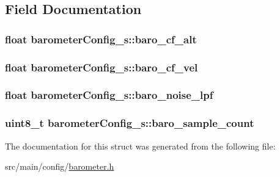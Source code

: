 \subsection{Field Documentation}
\hypertarget{structbarometerConfig__s_aaed2057a8ff4cdbb214b6b79861e84f0}{
\subsubsection[{baro\+\_\+cf\+\_\+alt}]{\setlength{\rightskip}{0pt plus 5cm}float barometer\+Config\+\_\+s\+::baro\+\_\+cf\+\_\+alt}}\label{structbarometerConfig__s_aaed2057a8ff4cdbb214b6b79861e84f0}
\hypertarget{structbarometerConfig__s_a6d480e4e6a8a2d631faa3d318f1bcc46}{
\subsubsection[{baro\+\_\+cf\+\_\+vel}]{\setlength{\rightskip}{0pt plus 5cm}float barometer\+Config\+\_\+s\+::baro\+\_\+cf\+\_\+vel}}\label{structbarometerConfig__s_a6d480e4e6a8a2d631faa3d318f1bcc46}
\hypertarget{structbarometerConfig__s_ae20135deb6dd6bf45b423ce09d3e687b}{
\subsubsection[{baro\+\_\+noise\+\_\+lpf}]{\setlength{\rightskip}{0pt plus 5cm}float barometer\+Config\+\_\+s\+::baro\+\_\+noise\+\_\+lpf}}\label{structbarometerConfig__s_ae20135deb6dd6bf45b423ce09d3e687b}
\hypertarget{structbarometerConfig__s_a8cfcc500e3be079ed3fcb6990640cded}{
\subsubsection[{baro\+\_\+sample\+\_\+count}]{\setlength{\rightskip}{0pt plus 5cm}uint8\+\_\+t barometer\+Config\+\_\+s\+::baro\+\_\+sample\+\_\+count}}\label{structbarometerConfig__s_a8cfcc500e3be079ed3fcb6990640cded}


The documentation for this struct was generated from the following file\+:\begin{DoxyCompactItemize}
\item 
src/main/config/\hyperlink{config_2barometer_8h}{barometer.\+h}\end{DoxyCompactItemize}
